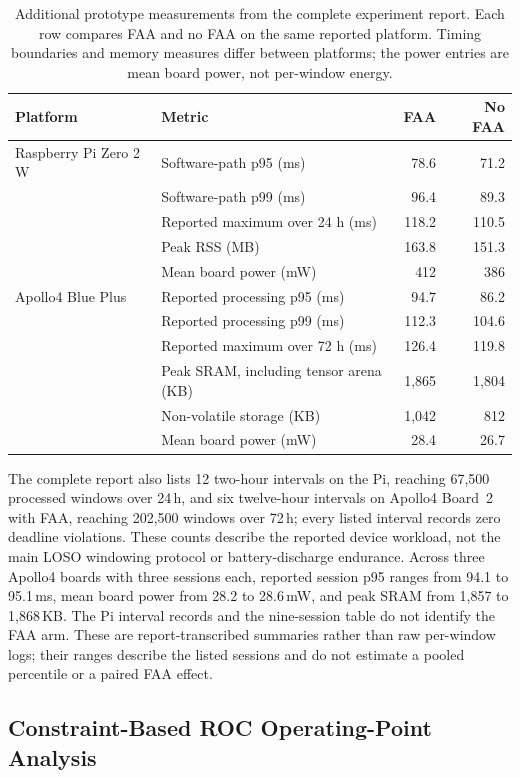 \documentclass[jec]{acnsart}
\begin{document}
\begin{table}[htbp]
\caption{Additional prototype measurements from the complete experiment report. Each row compares FAA and no FAA on the same reported platform. Timing boundaries and memory measures differ between platforms; the power entries are mean board power, not per-window energy.}
\label{tab:prototype}
\centering\small
\begin{tabular}{llrr}
\toprule
Platform & Metric & FAA & No FAA \\
\midrule
Raspberry Pi Zero 2 W & Software-path p95 (ms) & 78.6 & 71.2 \\
 & Software-path p99 (ms) & 96.4 & 89.3 \\
 & Reported maximum over 24 h (ms) & 118.2 & 110.5 \\
 & Peak RSS (MB) & 163.8 & 151.3 \\
 & Mean board power (mW) & 412 & 386 \\
\midrule
Apollo4 Blue Plus & Reported processing p95 (ms) & 94.7 & 86.2 \\
 & Reported processing p99 (ms) & 112.3 & 104.6 \\
 & Reported maximum over 72 h (ms) & 126.4 & 119.8 \\
 & Peak SRAM, including tensor arena (KB) & 1,865 & 1,804 \\
 & Non-volatile storage (KB) & 1,042 & 812 \\
 & Mean board power (mW) & 28.4 & 26.7 \\
\bottomrule
\end{tabular}
\end{table}

The complete report also lists 12 two-hour intervals on the Pi, reaching 67,500 processed windows over 24\,h, and six twelve-hour intervals on Apollo4 Board~2 with FAA, reaching 202,500 windows over 72\,h; every listed interval records zero deadline violations. These counts describe the reported device workload, not the main LOSO windowing protocol or battery-discharge endurance. Across three Apollo4 boards with three sessions each, reported session p95 ranges from 94.1 to 95.1\,ms, mean board power from 28.2 to 28.6\,mW, and peak SRAM from 1,857 to 1,868\,KB. The Pi interval records and the nine-session table do not identify the FAA arm. These are report-transcribed summaries rather than raw per-window logs; their ranges describe the listed sessions and do not estimate a pooled percentile or a paired FAA effect.

\subsection{Constraint-Based ROC Operating-Point Analysis}
\label{sec:operating}
\end{document}
